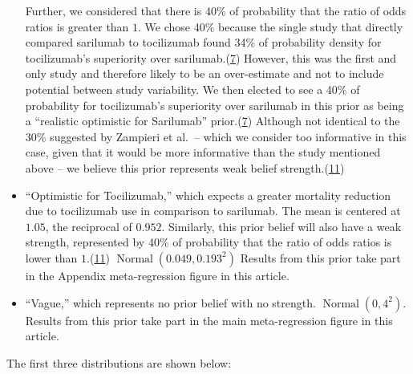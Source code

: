 \documentclass[
  12pt,
]{article}
\begin{document}
\begin{itemize}
  Further, we considered that there is 40\% of probability that the
  ratio of odds ratios is greater than \(1\). We chose 40\% because the
  single study that directly compared sarilumab to tocilizumab found
  34\% of probability density for tocilizumab's superiority over
  sarilumab.(\protect\hyperlink{ref-zotero-3144}{7}) However, this was
  the first and only study and therefore likely to be an over-estimate
  and not to include potential between study variability. We then
  elected to see a 40\% of probability for tocilizumab's superiority
  over sarilumab in this prior as being a ``realistic optimistic for
  Sarilumab'' prior.(\protect\hyperlink{ref-zotero-3144}{7}) Although
  not identical to the 30\% suggested by Zampieri et al.~-- which we
  consider too informative in this case, given that it would be more
  informative than the study mentioned above -- we believe this prior
  represents weak belief
  strength.(\protect\hyperlink{ref-zampieri2021}{11})
\item
  ``Optimistic for Tocilizumab,'' which expects a greater mortality
  reduction due to tocilizumab use in comparison to sarilumab. The mean
  is centered at \(1.05\), the reciprocal of \(0.952\). Similarly, this
  prior belief will also have a weak strength, represented by 40\% of
  probability that the ratio of odds ratios is lower than
  \(1\).(\protect\hyperlink{ref-zampieri2021}{11})
  \(\operatorname{Normal}(0.049, 0.193^2)\) Results from this prior take
  part in the Appendix meta-regression figure in this article.
\item
  ``Vague,'' which represents no prior belief with no strength.
  \(\operatorname{Normal}(0, 4^2)\). Results from this prior take part
  in the main meta-regression figure in this article.
\end{itemize}

The first three distributions are shown below:
\end{document}
